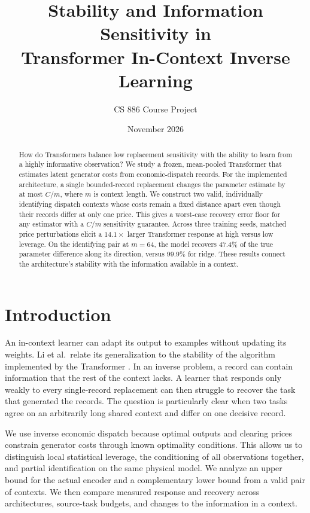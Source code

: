 \documentclass[11pt,letterpaper]{article}
\title{\textbf{Stability and Information Sensitivity in\\Transformer In-Context Inverse Learning}}
\author{CS 886 Course Project}
\date{November 2026}
\newcommand{\pct}[1]{#1\%}
\begin{document}
\maketitle

\begin{abstract}
How do Transformers balance low replacement sensitivity with the ability
to learn from a highly informative observation? We study a frozen,
mean-pooled Transformer that estimates latent generator costs from
economic-dispatch records. For the implemented architecture, a single
bounded-record replacement changes the parameter estimate by at most
\(C/m\), where \(m\) is context length. We construct two valid,
individually identifying dispatch contexts whose costs remain a fixed
distance apart even though their records differ at only one price.
This gives a worst-case recovery error floor for any estimator with a
\(C/m\) sensitivity guarantee. Across three training seeds, matched
price perturbations elicit a \(14.1\times\) larger Transformer response
at high versus low leverage. On the identifying pair at \(m=64\),
the model recovers \pct{47.4} of the true parameter difference along
its direction, versus \pct{99.9} for ridge. These results connect the
architecture's stability with the information available in a context.
\end{abstract}

\section{Introduction}
An in-context learner can adapt its output to examples without updating
its weights. Li et al.\ relate its generalization to the stability of the
algorithm implemented by the Transformer \cite{li}. In an inverse
problem, a record can contain information that the rest of the context
lacks. A learner that responds only weakly to every single-record
replacement can then struggle to recover the task that generated the
records. The question is particularly clear when two tasks agree on
an arbitrarily long shared context and differ on one decisive record.

We use inverse economic dispatch because optimal outputs and clearing
prices constrain generator costs through known optimality conditions.
This allows us to distinguish local statistical leverage, the
conditioning of all observations together, and partial identification
on the same physical model. We analyze an upper bound for the actual
encoder and a complementary lower bound from a valid pair of contexts.
We then compare measured response and recovery across architectures,
source-task budgets, and changes to the information in a context.
\end{document}
